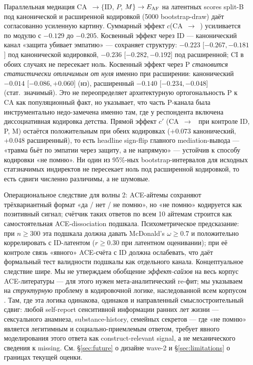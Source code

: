 Параллельная медиация CA~$\to\{$ID, $P$, $M\}\to E_{\mathrm{AF}}{}$ на латентных scores split-B под канонической и расширенной кодировкой (5000 bootstrap-draw) даёт согласованно усиленную картину. Суммарный эффект $c$(CA~$\to$~\EAF{}) усиливается по модулю с $-0.129$ до $-0.205$. Косвенный эффект через ID --- канонический канал «защита убивает эмпатию» --- сохраняет структуру: $-0.223$ [$-0.267, -0.181$] под канонической кодировкой, $-0.236$ [$-0.282, -0.192$] под расширенной; CI в обоих случаях не пересекает ноль. Косвенный эффект через P \emph{становится статистически отличимым от нуля} именно при расширении: канонический $-0.014$ [$-0.086, +0.060$] (нз), расширенный $-0.140$ [$-0.234, -0.048$] (стат.~значимый). Это не переопределяет архитектурную орто\-гональность P к CA как популяционный факт, но указывает, что часть P-канала была инструментально недо-замечена именно там, где у респондента включена диссоциативная кодировка детства. Прямой эффект $c'$ (CA~$\to$~\EAF{} при контроле ID, P, M) остаётся положительным при обеих кодировках ($+0.073$ канонический, $+0.048$ расширенный), то есть headline sign-flip главного mediation-вывода --- «травма бьёт по эмпатии через защиту, а не напрямую» --- устойчив к способу кодировки «не помню». Ни один из 95\%-ных bootstrap-интервалов для исходных статзначимых индиректов не пересекает ноль под расширенной кодировкой, то есть сдвиги численно различимы, а не шумовые.

Операциональное следствие для волны 2: ACE-айтемы сохраняют трёхвариантный формат «да / нет / не помню», но «не помню» кодируется как позитивный сигнал; счётчик таких ответов по всем 10 айтемам строится как самостоятельная ACE-dissociation подшкала. Психометрическое предсказание: при $n \ge 300$ эта подшкала должна давать McDonald's $\omega \ge 0.7$ и положительно коррелировать с ID-латентом ($r \ge 0.30$ при латентном оценивании); при её контроле связь «явного» ACE-счёта с ID должна ослабевать, что даёт формальный тест валидности подшкалы как отдельного канала. Концептуальное следствие шире. Мы не утверждаем обобщение \emph{эффект-сайзов} на весь корпус ACE-литературы --- для этого нужен мета-аналитический re-фит; мы указываем на \emph{структурную} проблему в кодировочной логике, наследованной всем корпусом \citep{felitti1998}. Там, где эта логика одинакова, одинаков и направленный смыслостроительный сдвиг: любой self-report сенситивной информации ранних лет жизни --- сексуального анамнеза, substance-history, семейных секретов --- где «не помню» является легитимным и социально-приемлемым ответом, требует явного моделирования этого ответа как construct-relevant signal, а не механического сведения к missing. См. §\ref{sec:future} о дизайне wave-2 и §\ref{sec:limitations} о границах текущей оценки.

